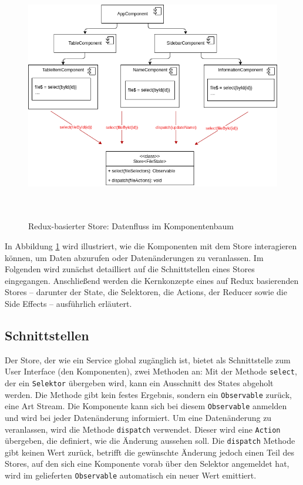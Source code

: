 \documentclass[12pt]{book}          %
\begin{document}
\begin{figure}[htbp]
\centering
\includegraphics[height=11cm]{abbildungen/easy-state.png}
\caption{Redux-basierter Store: Datenfluss im Komponentenbaum}
\label{redux-easy-state}
\end{figure}

In Abbildung \ref{redux-easy-state} wird illustriert, wie die Komponenten mit dem Store interagieren können, um Daten abzurufen oder Datenänderungen zu veranlassen. Im Folgenden wird zunächst detailliert auf die Schnittstellen eines Stores eingegangen. Anschließend werden die Kernkonzepte eines auf Redux basierenden Stores – darunter der State, die Selektoren, die Actions, der Reducer sowie die Side Effects – ausführlich erläutert.

\subsection{Schnittstellen}
\label{subsec-store-interfaces}

 Der Store, der wie ein Service global zugänglich ist, bietet als Schnittstelle zum User Interface (den Komponenten), zwei Methoden an: Mit der Methode \texttt{select}, der ein \texttt{Selektor} übergeben wird, kann ein Ausschnitt des States abgeholt werden. Die Methode gibt kein festes Ergebnis, sondern ein \texttt{Observable} zurück, eine Art Stream. Die Komponente kann sich bei diesem \texttt{Observable} anmelden und wird bei jeder Datenänderung informiert. Um eine Datenänderung zu veranlassen, wird die Methode \texttt{dispatch} verwendet. Dieser wird eine \texttt{Action} übergeben, die definiert, wie die Änderung aussehen soll. Die \texttt{dispatch} Methode gibt keinen Wert zurück, betrifft die gewünschte Änderung jedoch einen Teil des Stores, auf den sich eine Komponente vorab über den Selektor angemeldet hat, wird im gelieferten \texttt{Observable} automatisch ein neuer Wert emittiert.
\end{document}
